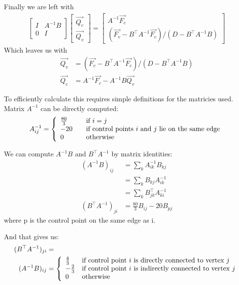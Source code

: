 \documentclass{article}
\begin{document}
Finally we are left with
\begin{align*}
\begin{bmatrix} 
I & A^{-1}B \\ 
0 & I
\end{bmatrix} 
\begin{bmatrix} 
\vec{Q_c} \\ 
\vec{Q_v}
\end{bmatrix}
=
\begin{bmatrix} 
A^{-1}\vec{F_c} \\ 
(\vec{F_v} - B^{\top}A^{-1}\vec{F_c})/(D - B^{\top}A^{-1}B)
\end{bmatrix}
\end{align*}
Which leaves us with
\begin{align*}
\vec{Q_v} &= (\vec{F_v} - B^{\top}A^{-1}\vec{F_c})/(D - B^{\top}A^{-1}B)\\
\vec{Q_c} &= A^{-1}\vec{F_c} - A^{-1}B \vec{Q_{v}}  
\end{align*}

To efficiently calculate this requires simple definitions for the matricies used.
Matrix $A^{-1}$ can be directly computed:
\begin{align*}
A^{-1}_{ij} = \left\{ 
  \begin{array}{l l}
    \frac{80}{3} & \quad \text{if $i=j$}\\
    -20 & \quad \text{if control points $i$ and $j$ lie on the same edge}\\
    0 & \quad \text{otherwise}\\
  \end{array} \right.
\end{align*}

We can compute $A^{-1}B$ and $B^{\top}A^{-1}$ by matrix identities:
\begin{align*}
(A^{-1}B)_{ij} &=  \sum_{k} A^{-1}_{ik} B_{kj} \\
&=  \sum_{k} B_{kj} A^{-1}_{ik} \\ 
&=  \sum_{k} B^{\top}_{jk} A^{-1}_{ki} \\ 
(B^{\top} A^{-1})_{ji} &=  \frac{80}{3} B_{ij} - 20 B_{pj}
\end{align*} 
where p is the control point on the same edge as i.

And that gives us:
\begin{align*}	
(B^{\top}A^{-1})_{ji} &=\\
(A^{-1}B)_{ij} &= \left\{ 
  \begin{array}{l l}
    \frac{4}{3} & \text{if control point $i$ is directly connected to vertex $j$}\\
    -\frac{2}{3} & \text{if control point $i$ is indirectly connected to vertex $j$}\\
    0 & \text{otherwise}\\
  \end{array} \right.  \\ 
\end{align*}
\end{document}
